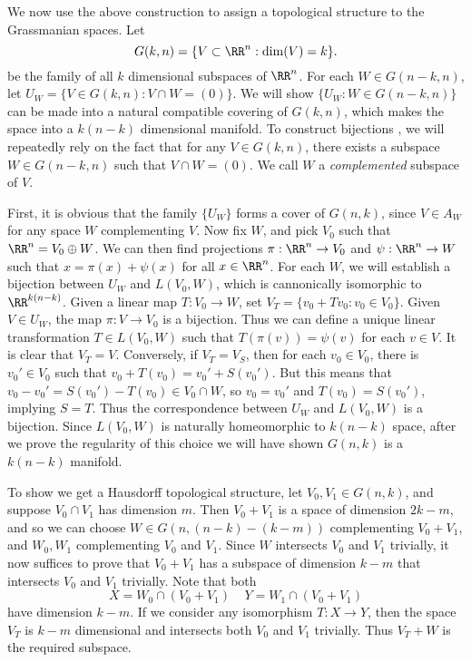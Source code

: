 \begin{example}[Grassmannian]
    We now use the above construction to assign a topological structure to the Grassmanian spaces. Let
    \[ G(k,n) = \{ V \subset \RR^n : \dim(V) = k \}. \]
    be the family of all $k$ dimensional subspaces of $\RR^n$. For each $W \in G(n-k,n)$, let $U_W = \{ V \in G(k,n): V \cap W = (0) \}$. We will show $\{ U_W : W \in G(n-k,n) \}$ can be made into a natural compatible covering of $G(k,n)$, which makes the space into a $k(n-k)$ dimensional manifold. To construct bijections     , we will repeatedly rely on the fact that for any $V \in G(k,n)$, there exists a subspace $W \in G(n-k,n)$ such that $V \cap W = (0)$. We call $W$ a \emph{complemented} subspace of $V$.

    First, it is obvious that the family $\{ U_W \}$ forms a cover of $G(n,k)$, since $V \in A_W$ for any space $W$ complementing $V$. Now fix $W$, and pick $V_0$ such that $\RR^n = V_0 \oplus W$. We can then find projections $\pi: \RR^n \to V_0$ and $\psi: \RR^n \to W$ such that $x = \pi(x) + \psi(x)$ for all $x \in \RR^n$. For each $W$, we will establish a bijection between $U_W$ and $L(V_0,W)$, which is cannonically isomorphic to $\RR^{k(n-k)}$. Given a linear map $T: V_0 \to W$, set $V_T = \{ v_0 + Tv_0 : v_0 \in V_0 \}$. Given $V \in U_W$, the map $\pi: V \to V_0$ is a bijection. Thus we can define a unique linear transformation $T \in L(V_0,W)$ such that $T(\pi(v)) = \psi(v)$ for each $v \in V$. It is clear that $V_T = V$. Conversely, if $V_T = V_S$, then for each $v_0 \in V_0$, there is $v_0' \in V_0$ such that $v_0 + T(v_0) = v_0' + S(v_0')$. But this means that $v_0 - v_0' = S(v_0') - T(v_0) \in V_0 \cap W$, so $v_0 = v_0'$ and $T(v_0) = S(v_0')$, implying $S = T$. Thus the correspondence between $U_W$ and $L(V_0,W)$ is a bijection. Since $L(V_0,W)$ is naturally homeomorphic to $k(n-k)$ space, after we prove the regularity of this choice we will have shown $G(n,k)$ is a $k(n-k)$ manifold.

    To show we get a Hausdorff topological structure, let $V_0,V_1 \in G(n,k)$, and suppose $V_0 \cap V_1$ has dimension $m$. Then $V_0 + V_1$ is a space of dimension $2k - m$, and so we can choose $W \in G(n,(n - k) - (k - m))$ complementing $V_0 + V_1$, and $W_0, W_1$ complementing $V_0$ and $V_1$. Since $W$ intersects $V_0$ and $V_1$ trivially, it now suffices to prove that $V_0 + V_1$ has a subspace of dimension $k - m$ that intersects $V_0$ and $V_1$ trivially. Note that both
    \[ X = W_0 \cap (V_0 + V_1)\ \ \ \ \ Y = W_1 \cap (V_0 + V_1) \]
    have dimension $k - m$. If we consider any isomorphism $T: X \to Y$, then the space $V_T$ is $k-m$ dimensional and intersects both $V_0$ and $V_1$ trivially. Thus $V_T + W$ is the required subspace.  


\end{example}
